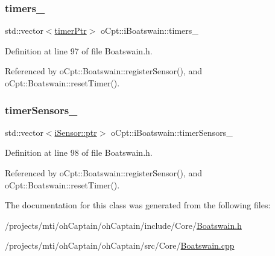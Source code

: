 \subsubsection{\texorpdfstring{timers\+\_\+}{timers\_}}
{\footnotesize\ttfamily std\+::vector$<$\hyperlink{classo_cpt_1_1i_boatswain_ac42d91dd3964880be9475ccaab4231cd}{timer\+Ptr}$>$ o\+Cpt\+::i\+Boatswain\+::timers\+\_\+\hspace{0.3cm}{\ttfamily [protected]}}



Definition at line 97 of file Boatswain.\+h.



Referenced by o\+Cpt\+::\+Boatswain\+::register\+Sensor(), and o\+Cpt\+::\+Boatswain\+::reset\+Timer().

\hypertarget{classo_cpt_1_1i_boatswain_ac25402266e3daa376e407a9f5ba73130}{}\label{classo_cpt_1_1i_boatswain_ac25402266e3daa376e407a9f5ba73130} 
\subsubsection{\texorpdfstring{timer\+Sensors\+\_\+}{timerSensors\_}}
{\footnotesize\ttfamily std\+::vector$<$\hyperlink{classo_cpt_1_1i_sensor_a03533d2c5dc66e332d70dbb3b5e3006a}{i\+Sensor\+::ptr}$>$ o\+Cpt\+::i\+Boatswain\+::timer\+Sensors\+\_\+\hspace{0.3cm}{\ttfamily [protected]}}



Definition at line 98 of file Boatswain.\+h.



Referenced by o\+Cpt\+::\+Boatswain\+::register\+Sensor(), and o\+Cpt\+::\+Boatswain\+::reset\+Timer().



The documentation for this class was generated from the following files\+:\begin{DoxyCompactItemize}
\item 
/projects/mti/oh\+Captain/oh\+Captain/include/\+Core/\hyperlink{_boatswain_8h}{Boatswain.\+h}\item 
/projects/mti/oh\+Captain/oh\+Captain/src/\+Core/\hyperlink{_boatswain_8cpp}{Boatswain.\+cpp}\end{DoxyCompactItemize}
